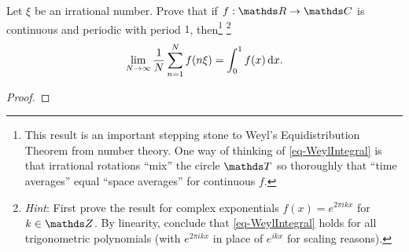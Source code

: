 \documentclass{../homework}
\date{Thursday 4/18}
\author{}
\begin{document}
\begin{Exercise}
  Let \(\xi\) be an irrational number.  Prove that if \(f:\R \to \C\)
  is continuous and periodic with period \(1\), then\footnote{This
    result is an important stepping stone to Weyl's Equidistribution
    Theorem from number theory.  One way of thinking of
    \eqref{eq-WeylIntegral} is that irrational rotations ``mix'' the
    circle \(\T\) so thoroughly that ``time averages'' equal ``space
    averages'' for continuous \(f\).}  \footnote{\emph{Hint}: First
    prove the result for complex exponentials
    \(f(x) = e^{2\pi i k x}\) for \(k \in \Z\).  By linearity,
    conclude that \eqref{eq-WeylIntegral} holds for all trigonometric
    polynomials (with \(e^{2\pi i kx}\) in place of \(e^{ikx}\) for
    scaling reasons).}
  \begin{equation}
    \label{eq-WeylIntegral}
    \lim_{N \to \infty} \frac{1}{N}
    \sum_{n=1}^N f(n \xi) = \int_0^1 f(x) \mathop{}\! \mathrm d x.
  \end{equation}

  \begin{solution}
    \begin{proof}

    \end{proof}
  \end{solution}
\end{Exercise}
\end{document}
